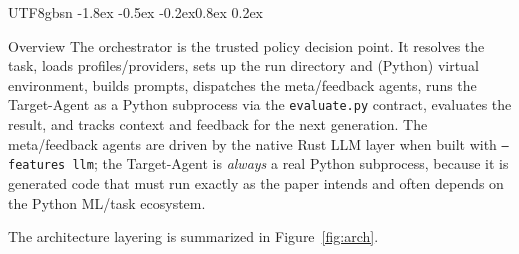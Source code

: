 \documentclass{article}
\makeatletter
\renewcommand{\subsection}{\@startsection{subsection}{2}{\z@}%
  {-1.8ex \@plus -0.5ex \@minus -0.2ex}{0.8ex \@plus 0.2ex}%
  {\normalsize\bfseries\raggedright\color{accent}}}
\makeatother
\begin{document}
\begin{CJK}{UTF8}{gbsn}
\subsection{Overview}
The orchestrator is the trusted policy decision point. It resolves the task, loads
profiles/providers, sets up the run directory and (Python) virtual environment,
builds prompts, dispatches the meta/feedback agents, runs the Target-Agent as a
Python subprocess via the \texttt{evaluate.py} contract, evaluates the result, and
tracks context and feedback for the next generation. The meta/feedback agents are
driven by the native Rust LLM layer when built with \texttt{--features llm}; the
Target-Agent is \emph{always} a real Python subprocess, because it is generated code
that must run exactly as the paper intends and often depends on the Python ML/task
ecosystem.

The architecture layering is summarized in Figure~\ref{fig:arch}.


\end{CJK}
\end{document}
